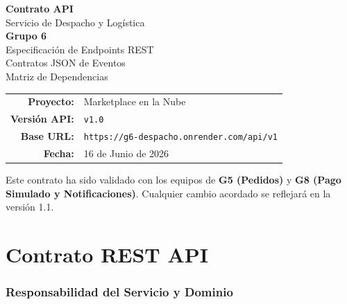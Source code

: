 \documentclass[11pt, a4paper]{article}
\begin{document}
\begin{titlepage}
\centering
\vspace*{2.5cm}

{\Huge\bfseries\textcolor{primary}{Contrato API}}\\[0.3cm]
{\LARGE\textcolor{primary!70}{Servicio de Despacho y Logística}}\\[0.5cm]
{\Large\textcolor{accent}{\textbf{Grupo 6}}}\\[2cm]

{\large Especificación de Endpoints REST}\\[0.2cm]
{\large Contratos JSON de Eventos}\\[0.2cm]
{\large Matriz de Dependencias}\\[3cm]

\begin{tabular}{rl}
  \textbf{Proyecto:}     & Marketplace en la Nube \\
  \textbf{Versión API:}  & \texttt{v1.0} \\
  \textbf{Base URL:}     & \texttt{https://g6-despacho.onrender.com/api/v1} \\
  \textbf{Fecha:}        & 16 de Junio de 2026 \\
\end{tabular}

\vfill

\begin{warningbox}[title={\faExclamationCircle\quad Documento de referencia}]
  Este contrato ha sido validado con los equipos de \textbf{G5 (Pedidos)}
  y \textbf{G8 (Pago Simulado y Notificaciones)}.
  Cualquier cambio acordado se reflejará en la versión 1.1.
\end{warningbox}

\end{titlepage}

\tableofcontents
\newpage


\part{Contrato REST API}

\section{Responsabilidad del Servicio y Dominio}
\end{document}
